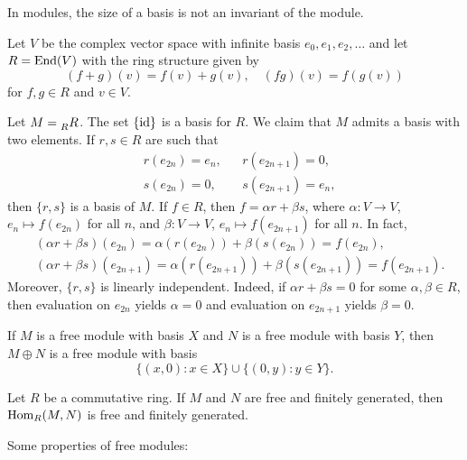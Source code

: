 In modules, the size of a basis is not an invariant of the module.  

\begin{example}
Let $V$ be the complex vector space with infinite basis $e_0,e_1,e_2,\dots$ and let 
$R=\operatorname{End}(V)$ with the ring structure given by 
\[
(f+g)(v)=f(v)+g(v),\quad
(fg)(v)=f(g(v))
\]
for $f,g\in R$ and $v\in V$. 

Let $M=\prescript{}{R}R$. 
The set $\{\operatorname{id}\}$ is a basis for $R$.  
We claim that $M$ admits a basis with two elements. If
$r,s\in R$ are such that 
\begin{align*}
&r(e_{2n})=e_n, && r(e_{2n+1})=0,\\
&s(e_{2n})=0,&& s(e_{2n+1})=e_{n},
\end{align*}
then $\{r,s\}$ is a basis of $M$. 
If $f\in R$, then
$f=\alpha r+\beta s$, where $\alpha\colon V\to V$, $e_n\mapsto f(e_{2n})$ for all $n$, and
$\beta\colon V\to V$, $e_n\mapsto f(e_{2n+1})$ for all $n$. In fact,
\begin{align*}
&(\alpha r+\beta s)(e_{2n})=\alpha(r(e_{2n}))+\beta(s(e_{2n}))=f(e_{2n}),\\
&(\alpha r+\beta s)(e_{2n+1})=\alpha(r(e_{2n+1}))+\beta(s(e_{2n+1}))=f(e_{2n+1}).
\end{align*}
Moreover, $\{r,s\}$ is linearly independent. Indeed, if $\alpha r+\beta s=0$
for some $\alpha,\beta\in R$, then evaluation on $e_{2n}$ yields $\alpha=0$ and
evaluation on $e_{2n+1}$ yields $\beta=0$.   
\end{example} 

\begin{example}
If $M$ is a free module with basis $X$ and $N$ 
is a free module with basis $Y$, then 
$M\oplus N$ is a free module with basis 
\[
\{(x,0):x\in X\}\cup \{(0,y):y\in Y\}.
\]	
\end{example}

\begin{exercise}
Let $R$ be a commutative ring. If $M$ and $N$ 
are free and finitely generated, then 
$\operatorname{Hom}_R(M,N)$
is free and finitely generated.
\end{exercise}

Some properties of free modules:

